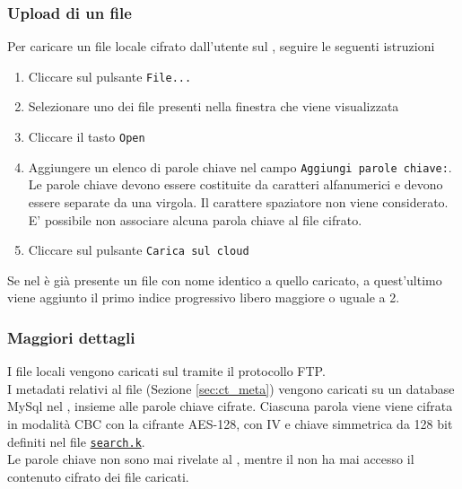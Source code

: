 \documentclass[a4paper,twoside,10pt,openany]{scrbook}
\begin{document}
\subsubsection{Upload di un file}\label{sec:upload}
%
Per caricare un file locale cifrato dall'utente sul \sa, seguire le seguenti istruzioni
\begin{enumerate}
 \item Cliccare sul pulsante \texttt{File...}
 \item Selezionare uno dei file presenti nella finestra che viene visualizzata
 \item Cliccare il tasto \texttt{Open}
 \item Aggiungere un elenco di parole chiave nel campo \texttt{Aggiungi parole chiave:}. Le parole chiave devono essere costituite da caratteri alfanumerici e devono essere separate da una virgola. Il carattere spaziatore non viene considerato. E' possibile non associare alcuna parola chiave al file cifrato.
 \item Cliccare sul pulsante \texttt{Carica sul cloud}
\end{enumerate}
Se nel \sa è già presente un file con nome identico a quello caricato, a quest'ultimo viene aggiunto il primo indice progressivo libero maggiore o uguale a 2.
%
\subsubsection*{Maggiori dettagli}
%
I file locali vengono caricati sul \sa tramite il protocollo FTP.\\
I metadati relativi al file (Sezione \ref{sec:ct_meta}) vengono caricati su un database MySql nel \sr, insieme alle parole chiave cifrate.
Ciascuna parola viene viene cifrata in modalità CBC con la cifrante AES-128, con IV e chiave simmetrica da 128 bit definiti nel file \texttt{\hyperref[sec:format_searchk]{search.k}}.\\
Le parole chiave non sono mai rivelate al \sa, mentre il \sr non ha mai accesso il contenuto cifrato dei file caricati.
%
\end{document}
